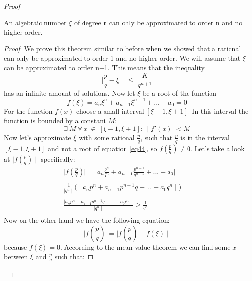 \documentclass{article}
\theoremstyle{definition}
\begin{document}
\begin{proof}
\begin{theorem}
    An algebraic number $\xi$ of  degree n
    can only be approximated to order n and no higher order.
\end{theorem}

\begin{proof}
We prove this theorem similar to before when we showed that a rational can only be approximated to order 1 and no higher order. We will assume that $\xi$ can be approximated to order n+1. This means that the inequality
\begin{equation}
\label{approx}
    \mid \frac{p}{q}-\xi\mid \: \leq \:  \frac{K}{q^{n+1}}
\end{equation}
has an infinite amount of solutions. 
Now let $\xi$ be a root of the function
      \begin{equation}
      \label{eq44}
        f(\xi) = a_n \xi ^n + a_{n-1}\xi^{n-1}+...+a_0 = 0
    \end{equation}
    For the function $f(x)$ choose a small interval $[\xi-1,\xi+1]$. In this interval the function is bounded by a constant $M$:
    \begin{equation}
    \label{45eq}
        \exists \: M \: \forall \:  x \: \in \: [\xi-1,\xi+1]: \:  \mid f'(x)\mid < M
    \end{equation}
    Now let's approximate $\xi$ with some rational $\frac{p}{q}$, such that $\frac{p}{q}$ is in the interval $[\xi-1,\xi+1]$ and not a root of equation \ref{eq44}, so $f(\frac{p}{q})\neq 0$. Let's take a look at $\mid f(\frac{p}{q}) \mid $ specifically:
    \begin{align}
    \label{48eq}
        \mid f(\frac{p}{q}) \mid =\mid  a_n \frac{p^n}{q^n} + a_{n-1}\frac{p^{n-1}}{q^{n-1}} + ... + a_0 \mid = \\
        \\
        \frac{1}{\mid q^n \mid } \Big( \mid  a_n p^n + a_{n-1}p^{n-1} q + ... + a_0 q^n  \mid \Big) = \\
        \\
        \frac{\mid  a_n p^n + a_{n-1}p^{n-1} q + ... + a_0 q^n  \mid}{\mid q^n \mid} \geq \frac{1}{q^n} \\
    \end{align}
    Now on the other hand we have the following equation:
    \begin{equation}
    \label{49eq}
        \mid f(\frac{p}{q}) \mid = \mid f(\frac{p}{q}) - f(\xi) \mid
    \end{equation}
    because $f(\xi)=0$. According to the mean value theorem we can find some $x$ between $\xi$ and $\frac{p}{q}$ such that:

\end{proof}
\end{proof}
\end{document}
